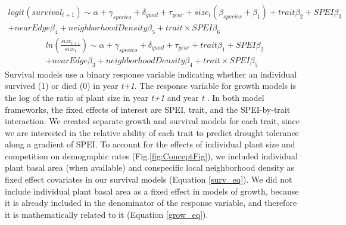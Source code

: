 \documentclass[12pt, letterpaper]{article}
\begin{document}
\begin{multline}
\label{surv_eq}
logit(survival_{t+1})\sim \alpha + \gamma_{species}+ \delta_{quad} + \tau_{year} + size_t(\beta_{species}  + \beta_1) + trait\beta_2+ SPEI\beta_3\\ + nearEdge\beta_4  + neighborhoodDensity\beta_5 + trait\times SPEI\beta_6
\end{multline}
\begin{multline}
\label{grow_eq} 
ln(\frac{size_{t+1}} { size_{t}} )\sim \alpha + \gamma_{species}+ \delta_{quad} + \tau_{year} +   trait\beta_1+ SPEI\beta_2\\ + nearEdge\beta_3  + neighborhoodDensity\beta_4 + trait\times SPEI\beta_5
\end{multline}
Survival models use a binary response variable indicating whether an individual survived (1) or died (0) in year \textit{t+1}. The response variable for growth models is the log of the ratio of plant size in year \textit{t+1} and year \textit{t} \citep{Dalgleish2011ClimatePlants, Dahlgren2009LinkingHerb}. In both model frameworks, the fixed effects of interest are SPEI, trait, and the SPEI-by-trait interaction. We created separate growth and survival models for each trait, since we are interested in the relative ability of each trait to predict drought tolerance along a gradient of SPEI. To account for the effects of individual plant size \citep{Tredennick2018} and competition on demographic rates (Fig.\ref{fig:ConceptFig}), we included individual plant basal area (when available) and conspecific local neighborhood density as fixed effect covariates in our survival models (Equation \ref{surv_eq}). We did not include individual plant basal area as a fixed effect in models of growth, because it is already included in the denominator of the response variable, and therefore it is mathematically related to it (Equation \ref{grow_eq}).
\end{document}
